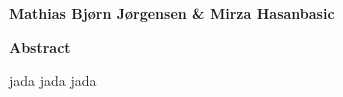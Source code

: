 \thispagestyle{plain}
\begin{center}
    \vspace{0.4cm}
    \textbf{Mathias Bjørn Jørgensen \& Mirza Hasanbasic}

    \vspace{0.9cm}
    \textbf{Abstract}
\end{center}


jada jada jada